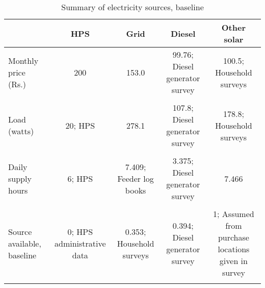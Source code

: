 \begin{table}[htbp]\centering
\caption{Summary of electricity sources, baseline\label {tab1}}
\begin{tabular}{l*{4}{c}}
\toprule
                &   HPS&   Grid&   Diesel&  Other solar\\
\midrule
Monthly price (Rs.)&  200&   153.0 &    99.76; Diesel generator survey &  100.5; Household surveys\\
                &         &         &         &         \\
\addlinespace
Load (watts)    &   20; HPS & 278.1&    107.8; Diesel generator survey &    178.8; Household surveys\\
                &         &         &         &         \\
\addlinespace
Daily supply hours&   6; HPS & 7.409; Feeder log books &    3.375; Diesel generator survey &    7.466\\
                &         &         &         &         \\
\addlinespace
Source available, baseline& 0; HPS administrative data &    0.353; Household surveys &    0.394; Diesel generator survey &  1; Assumed from purchase locations given in survey\\
                &         &         &         &         \\
\bottomrule
\end{tabular}
\end{table}
